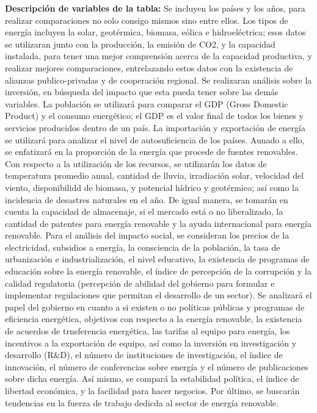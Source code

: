 \documentclass[
  letterpaper,
  DIV=11,
  numbers=noendperiod]{scrreprt}
\begin{document}
\textbf{Descripción de variables de la tabla:} Se incluyen los países y
los años, para realizar comparaciones no solo consigo mismos sino entre
ellos. Los tipos de energía incluyen la solar, geotérmica, biomasa,
eólica e hidroeléctrica; esos datos se utilizaran junto con la
producción, la emisión de CO2, y la capacidad instalada, para tener una
mejor comprensión acerca de la capacidad productiva, y realizar mejores
comparaciones, entrelazando estos datos con la existencia de alianzas
publico-privadas y de cooperación regional. Se realizaran análisis sobre
la inversión, en búsqueda del impacto que esta pueda tener sobre las
demás variables. La población se utilizará para comparar el GDP (Gross
Domestic Product) y el consumo energético; el GDP es el valor final de
todos los bienes y servicios producidos dentro de un país. La
importación y exportación de energía se utilizará para analizar el nivel
de autosuficiencia de los países. Aunado a ello, se enfatizará en la
proporción de la energía que procede de fuentes renovables. Con respecto
a la utilización de los recursos, se utilizarán los datos de temperatura
promedio anual, cantidad de lluvia, irradiación solar, velocidad del
viento, disponibilidd de biomasa, y potencial hídrico y geotérmico; así
como la incidencia de desastres naturales en el año. De igual manera, se
tomarán en cuenta la capacidad de almacenaje, si el mercado está o no
liberalizado, la cantidad de patentes para energía renovable y la ayuda
internacional para energía renovable. Para el análisis del impacto
social, se consideran los precios de la electricidad, subsidios a
energía, la consciencia de la población, la tasa de urbanización e
industrialización, el nivel educativo, la existencia de programas de
educación sobre la energía renovable, el índice de percepción de la
corrupción y la calidad regulatoria (percepción de abilidad del gobierno
para formular e implementar regulaciones que permitan el desarrollo de
un sector). Se analizará el papel del gobierno en cuanto a si existen o
no políticas públicas y programas de eficiencia energética, objetivos
con respecto a la energía renovable, la existencia de acuerdos de
trnsferencia energética, las tarifas al equipo para energía, los
incentivos a la exportación de equipo, así como la inversión en
investigación y desarrollo (R\&D), el número de instituciones de
investigación, el índice de innovación, el número de conferencias sobre
energía y el número de publicaciones sobre dicha energía. Así mismo, se
compará la estabilidad política, el índice de libertad económica, y la
facilidad para hacer negocios. Por último, se buscarán tendencias en la
fuerza de trabajo dedicda al sector de energía renovable.
\end{document}
